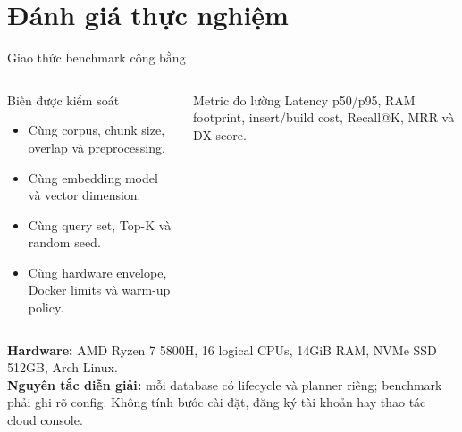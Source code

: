 \section{Đánh giá thực nghiệm}

\begin{frame}{Giao thức benchmark công bằng}
	\begin{columns}
		\begin{block}{Biến được kiểm soát}
			\begin{itemize}
				\item Cùng corpus, chunk size, overlap và preprocessing.
				\item Cùng embedding model và vector dimension.
				\item Cùng query set, Top-K và random seed.
				\item Cùng hardware envelope, Docker limits và warm-up policy.
			\end{itemize}
		\end{block}
		\begin{exampleblock}{Metric đo lường}
			Latency p50/p95, RAM footprint, insert/build cost, Recall@K, MRR và DX score.
		\end{exampleblock}
	\end{columns}
	\vspace{0.08cm}
	\scriptsize\textbf{Hardware:} AMD Ryzen 7 5800H, 16 logical CPUs, 14GiB RAM, NVMe SSD 512GB, Arch Linux.\\
	\textbf{Nguyên tắc diễn giải:} mỗi database có lifecycle và planner riêng; benchmark phải ghi rõ config. Không tính bước cài đặt, đăng ký tài khoản hay thao tác cloud console.
\end{frame}

